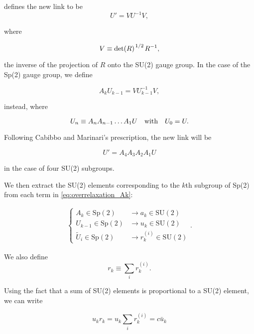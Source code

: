 \documentclass[reqno,12pt]{article}
\numberwithin{equation}{section}
\newcommand{\SU}{\mathrm{SU}}
\newcommand{\Sp}{\mathrm{Sp}}
\begin{document}
\cite{montvay} defines the new link to be
\begin{equation}
	U' = V U^{-1} V,
\end{equation}

where 

\begin{equation}
	V \equiv \det(R)^{\flatfrac{1}{2}} R^{-1},
\end{equation}

the inverse of the projection of $R$ onto the SU(2) gauge group. In the case of the Sp(2) gauge group, 
we define 

\begin{equation} \label{eq:overrelaxation_Ak}
	A_k U_{k-1} = V U_{k-1}^{-1} V,
\end{equation}

instead, where 

\begin{equation}
	U_{n} \equiv A_n A_{n-1} \dots A_1 U \qq{with} U_0 = U.
\end{equation}

Following Cabibbo and Marinari's prescription, the new link will be

\begin{equation} \label{eq:overrelaxation_newlink}
	U' = A_4 A_3 A_2 A_1 U
\end{equation}

in the case of four SU(2) subgroups.

We then extract the SU(2) elements corresponding to the $k$th subgroup of Sp(2) 
from each term in \eqref{eq:overrelaxation_Ak}:

\begin{eqnarray}
	\begin{cases}
		A_k \in \Sp(2) &\longrightarrow a_k \in \SU(2) \\
		U_{k-1} \in \Sp(2) &\longrightarrow u_k \in \SU(2) \\
		\widetilde{U}_i \in \Sp(2) &\longrightarrow r_k^{(i)} \in \SU(2)
	\end{cases}.
\end{eqnarray}

We also define
\begin{equation}
	r_k \equiv \sum_i r_k^{(i)}.
\end{equation}

Using the fact that a sum of SU(2) elements is proportional to a SU(2) element, we can write

\begin{equation}
	u_k r_k = u_k \sum_i r_k^{(i)} = c \bar{u}_k
\end{equation}
\end{document}
